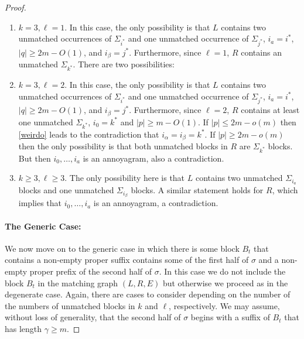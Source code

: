 \documentclass[kpfonts]{patmorin}
\begin{document}
\begin{proof}
\begin{enumerate}
        \item $k=3,\ell= 1$.  In this case, the only possibility is that $L$ contains two unmatched occurrences of $\Sigma_{i^*}$ and one unmatched occurrence of $\Sigma_{j^*}$, $i_a=i^*$, $|q|\ge 2m-O(1)$, and $i_\beta=j^*$.  Furthermore, since $\ell=1$, $R$ contains an unmatched $\Sigma_{k^*}$.  There are two possibilities:

        \item $k=3,\ell=2$. In this case, the only possibility is that $L$ contains two unmatched occurrences of $\Sigma_{i^*}$ and one unmatched occurrence of $\Sigma_{j^*}$, $i_a=i^*$, $|q|\ge 2m-O(1)$, and $i_\beta=j^*$.  Furthermore, since $\ell=2$, $R$ contains at least one unmatched $\Sigma_{k^*}$, $i_0=k^*$ and $|p|\ge m-O(1)$.  If $|p|\le 2m-o(m)$ then \cref{weirdo} leads to the contradiction that $i_\alpha=i_\beta=k^*$.  If $|p|\ge 2m-o(m)$ then the only possibility is that both unmatched blocks in $R$ are $\Sigma_{k^*}$ blocks.  But then $i_0,\ldots,i_a$ is an annoyagram, also a contradiction.

        \item $k\ge 3,\ell\ge 3$.  The only possibility here is that $L$ contains two unmatched $\Sigma_{i_a}$ blocks and one unmatched $\Sigma_{i_\beta}$ blocks.  A similar statement holds for $R$, which implies that $i_0,\ldots,i_a$ is an annoyagram, a contradiction.
    \end{enumerate}


    \paragraph{The Generic Case:}
    We now move on to the generic case in which there is some block $B_t$ that contains a non-empty proper suffix contains some of the first half of $\sigma$ and a non-empty proper prefix of the second half of $\sigma$.  In this case we do not include the block $B_t$ in the matching graph $(L,R,E)$ but otherwise we proceed as in the degenerate case.  Again, there are cases to consider depending on the number of the numbers of unmatched blocks in $k$ and $\ell$, respectively.  We may assume, without loss of generality, that the second half of $\sigma$ begins with a suffix of $B_t$ that has length $\gamma \ge m$.


\end{proof}
\end{document}
